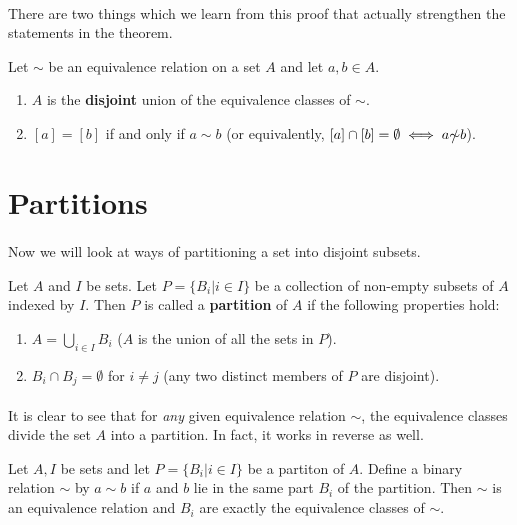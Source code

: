 \documentclass[../abstract_algebra.tex]{subfiles}
\begin{document}
        \paragraph{}
        There are two things which we learn from this proof that actually strengthen the statements in the theorem.
        \begin{corollary}
            Let $\sim$ be an equivalence relation on a set $A$ and let $a,b\in A$.
            \begin{enumerate}[label={\upshape(\roman*)}]
                \item $A$ is the \textbf{disjoint} union of the equivalence classes of $\sim$.
                \item $[a]=[b]$ if and only if $a\sim b$ (or equivalently, $[a]\cap[b]=\emptyset\iff a\slashed{\sim}b$).
            \end{enumerate}
        \end{corollary}

    \section{Partitions}
        \paragraph{}
        Now we will look at ways of partitioning a set into disjoint subsets.
        \begin{definition}
            Let $A$ and $I$ be sets. Let $P=\{B_i|i\in I\}$ be a collection of non-empty subsets of $A$ indexed by $I$.
            Then $P$ is called a \textbf{partition} of $A$ if the following properties hold:
            \begin{enumerate}[label={\upshape(\roman*)}]
                \item $A=\bigcup_{i\in I}B_i$ ($A$ is the union of all the sets in $P$).
                \item $B_i\cap B_j=\emptyset$ for $i\neq j$ (any two distinct members of $P$ are disjoint).
            \end{enumerate}
        \end{definition}
        
        \paragraph{}
        It is clear to see that for \textit{any} given equivalence relation $\sim$, the equivalence classes divide the set $A$ into a partition.
        In fact, it works in reverse as well.
        \begin{theorem}
            Let $A,I$ be sets and let $P=\{B_i|i\in I\}$ be a partiton of $A$.
            Define a binary relation $\sim$ by $a\sim b$ if $a$ and $b$ lie in the same part $B_i$ of the partition.
            Then $\sim$ is an equivalence relation and $B_i$ are exactly the equivalence classes of $\sim$.
        \end{theorem}
\end{document}
